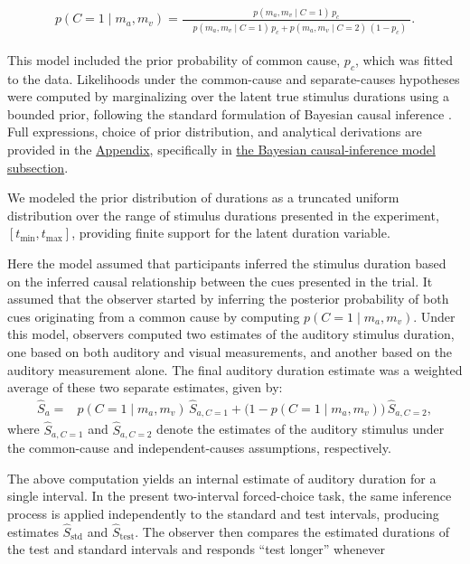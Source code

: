 \documentclass{jov}
\providecommand{\citep}[1]{\cite{#1}}
\begin{document}
\begin{equation}
\begin{split}
p(C=1 \mid m_a, m_v)
=
\frac{
p(m_a, m_v \mid C=1)\, p_c
}{
\begin{aligned}
&p(m_a, m_v \mid C=1)\, p_c + p(m_a, m_v \mid C=2)\, (1 - p_c)
\end{aligned}
}.
\end{split}
\label{eq:posterior_common_cause}
\end{equation}

This model included the prior probability of common cause, $p_c$, which was fitted to the data. Likelihoods under the common-cause and separate-causes hypotheses were computed by marginalizing over the latent true stimulus durations using a bounded prior, following the standard formulation of Bayesian causal inference \citep{kording2007causal}. Full expressions, choice of prior distribution, and analytical derivations are provided in the \hyperref[app:appendix]{Appendix}, specifically in \hyperref[causal_inf_equations]{the Bayesian causal-inference model subsection}.

We modeled the prior distribution of durations as a truncated uniform distribution over the range of stimulus durations presented in the experiment, $[t_{\min}, t_{\max}]$, providing finite support for the latent duration variable. 

Here the model assumed that participants inferred the stimulus duration based on the inferred causal relationship between the cues presented in the trial. It assumed that the observer started by inferring the posterior probability of both cues originating from a common cause by computing $p(C = 1 \mid m_a, m_v)$. Under this model, observers computed two estimates of the auditory stimulus duration, one based on both auditory and visual measurements, and another based on the auditory measurement alone. The final auditory duration estimate was a weighted average of these two separate estimates, given by:
\begin{align}
\hat S_{a}
= {}& p(C=1 \mid m_a,m_v)\,\hat S_{a,C=1}
+ \bigl(1 - p(C=1 \mid m_a,m_v)\bigr)\,
   \hat S_{a,C=2},
\label{eq:estimate_model_avg}
\end{align}
where $\hat S_{a,C=1}$ and $\hat S_{a,C=2}$ denote the estimates of the auditory stimulus under the common-cause and independent-causes assumptions, respectively.

The above computation yields an internal estimate of auditory duration for a single interval. In the present two-interval forced-choice task, the same inference process is applied independently to the standard and test intervals, producing estimates $\hat S_{\mathrm{std}}$ and $\hat S_{\mathrm{test}}$. The observer then compares the estimated durations of the test and standard intervals and responds ``test longer'' whenever
\end{document}
